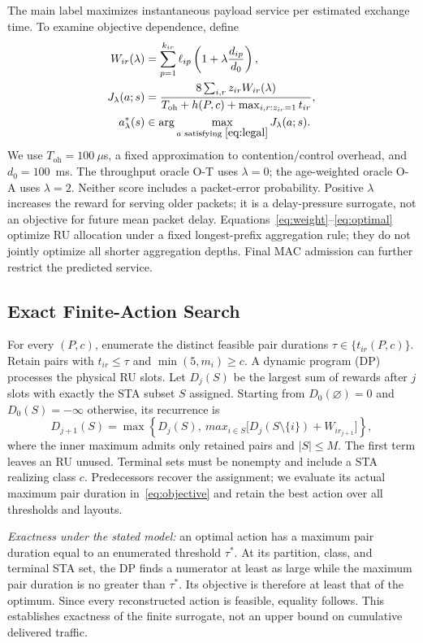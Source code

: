 \documentclass[10pt,journal,onecolumn]{IEEEtran}
\begin{document}
The main label maximizes instantaneous payload service per estimated exchange
time. To examine objective dependence, define
\begin{align}
 W_{ir}(\lambda)&=\sum_{p=1}^{k_{ir}}\ell_{ip}
             \left(1+\lambda\frac{d_{ip}}{d_0}\right),\label{eq:weight}\\
 J_\lambda(a;s)&=
 \frac{8\sum_{i,r}z_{ir}W_{ir}(\lambda)}
 {T_{\mathrm{oh}}+h(P,c)+\max_{i,r:z_{ir}=1}t_{ir}},\label{eq:objective}\\
 a^*_\lambda(s)&\in\arg\max_{a\text{ satisfying }\eqref{eq:legal}}J_\lambda(a;s).
 \label{eq:optimal}
\end{align}
We use $T_{\mathrm{oh}}=100~\mu$s, a fixed approximation to contention/control
overhead, and $d_0=100$~ms. The throughput oracle O-T uses $\lambda=0$;
the age-weighted oracle O-A uses $\lambda=2$. Neither score includes a
packet-error probability. Positive $\lambda$ increases the reward for
serving older packets; it is a delay-pressure surrogate, not an objective
for future mean packet delay. Equations~\eqref{eq:weight}--\eqref{eq:optimal}
optimize RU allocation under a fixed longest-prefix aggregation rule;
they do not jointly optimize all shorter aggregation depths. Final MAC
admission can further restrict the predicted service.

\subsection{Exact Finite-Action Search}
For every $(P,c)$, enumerate the distinct feasible pair durations
$\tau\in\{t_{ir}(P,c)\}$. Retain pairs with $t_{ir}\leq\tau$ and
$\min(5,m_i)\geq c$. A dynamic program (DP) processes the physical RU slots.
Let $D_j(S)$ be the largest sum of rewards after $j$ slots with exactly
the STA subset $S$ assigned. Starting from $D_0(\varnothing)=0$ and
$D_0(S)=-\infty$ otherwise, its recurrence is
\begin{equation}
 D_{j+1}(S)=\max\left\{D_j(S),\ max_{i\in S}
      \big[D_j(S\setminus\{i\})+W_{i r_{j+1}}\big]\right\},
 \label{eq:dp}
\end{equation}
where the inner maximum admits only retained pairs and $|S|\leq M$.
The first term leaves an RU unused. Terminal sets must be nonempty and
include a STA realizing class $c$. Predecessors recover the assignment;
we evaluate its actual maximum pair duration in~\eqref{eq:objective} and
retain the best action over all thresholds and layouts.

\emph{Exactness under the stated model:} an optimal action has a maximum
pair duration equal to an enumerated threshold $\tau^*$. At its partition,
class, and terminal STA set, the DP finds a numerator at least as large
while the maximum pair duration is no greater than $\tau^*$. Its objective
is therefore at least that of the optimum. Since every reconstructed action
is feasible, equality follows. This establishes exactness of the finite
surrogate, not an upper bound on cumulative delivered traffic.
\end{document}
